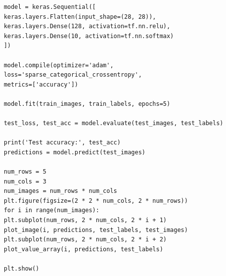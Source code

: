 \begin{verbatim}
	model = keras.Sequential([
	keras.layers.Flatten(input_shape=(28, 28)),
	keras.layers.Dense(128, activation=tf.nn.relu),
	keras.layers.Dense(10, activation=tf.nn.softmax)
	])
	
	model.compile(optimizer='adam',
	loss='sparse_categorical_crossentropy',
	metrics=['accuracy'])
	
	model.fit(train_images, train_labels, epochs=5)
	
	test_loss, test_acc = model.evaluate(test_images, test_labels)
	
	print('Test accuracy:', test_acc)
	predictions = model.predict(test_images)
	
	num_rows = 5
	num_cols = 3
	num_images = num_rows * num_cols
	plt.figure(figsize=(2 * 2 * num_cols, 2 * num_rows))
	for i in range(num_images):
	plt.subplot(num_rows, 2 * num_cols, 2 * i + 1)
	plot_image(i, predictions, test_labels, test_images)
	plt.subplot(num_rows, 2 * num_cols, 2 * i + 2)
	plot_value_array(i, predictions, test_labels)
	
	plt.show()
	\end{verbatim}
	
	